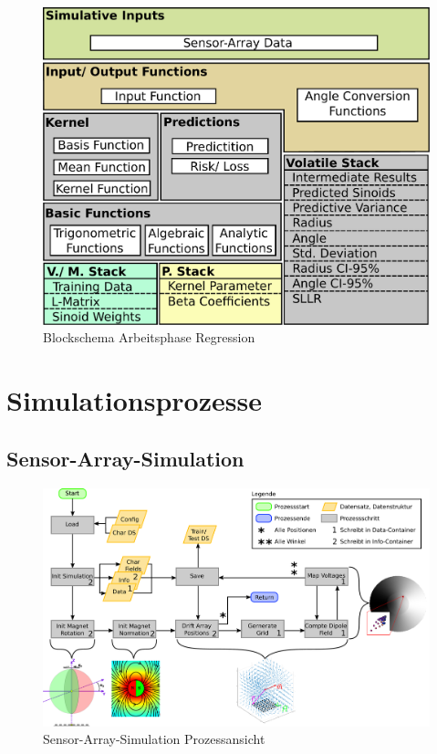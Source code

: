 \begin{figure}[tbph]
	\centering
	\includegraphics[width=0.7\linewidth]{chapters/images/3-SW-E-OExp/Blockschema_Workphase}
	\caption[Blockschema Arbeitsphase Regression]{Blockschema Arbeitsphase Regression}
	\label{fig:blockschemaworkphase}
\end{figure}


\clearpage


\section{Simulationsprozesse}\label{sec:sim-pro}


\subsection{Sensor-Array-Simulation}\label{sub:sensor-array-pro}


\begin{figure}[tbph]
	\centering
	\includegraphics[width=\linewidth]{chapters/images/3-SW-E-OExp/Sensor-Array-Simulation}
	\caption[Sensor-Array-Simulation Prozessansicht]{Sensor-Array-Simulation Prozessansicht}
	\label{fig:sensor-array-simulation}
\end{figure}

